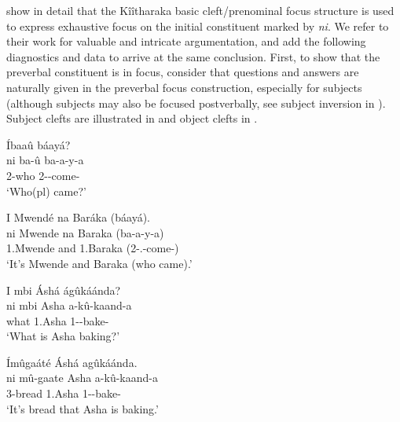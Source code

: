 \documentclass[output=paper]{langscibook}
\begin{document}
\z
\z

\citet{AbelsMuriungi2008} show in detail that the Kîîtharaka basic cleft\slash prenominal focus structure is used to express exhaustive focus on the initial constituent marked by \textit{ni}. We refer to their work for valuable and intricate argumentation, and add the following diagnostics and data to arrive at the same conclusion. First, to show that the preverbal constituent is in focus, consider that questions and answers are naturally given in the preverbal focus construction, especially for subjects (although subjects may also be focused postverbally, see subject inversion in ). Subject clefts are illustrated in  and object clefts in .

\ea
\label{bkm:Ref132102107}
\begin{xlist}
\'{I}baaû báayá?\\
\gll
ni  ba-û  ba-a-y-a\\
\FOC{} 2-who 2\SM-\PST{}-come-\FV{}\\
\glt
‘Who(pl) came?’

I Mwendé na Baráka (báayá).\\
\gll
ni  Mwende  na  Baraka  (ba-a-y-a)\\
\FOC{} 1.Mwende  and  1.Baraka  (2\SM-\N.\PST{}-come-\FV{})\\
\glt ‘It’s Mwende and Baraka (who came).’

\end{xlist}
\z

\ea
\label{bkm:Ref132102116}
\begin{xlist}
I mbi Áshá ágûkáánda?\\
\gll
ni  mbi  Asha  a-kû-kaand-a\\
\FOC{} what 1.Asha 1\SM-\PRS{}-bake-\FV{}\\
\glt
‘What is Asha baking?’

\'{I}mûgaáté Áshá agûkáánda.\\
\gll
ni  mû-gaate  Asha  a-kû-kaand-a\\
\FOC{} 3-bread  1.Asha 1\SM-\PRS{}-bake-\FV{}\\
\glt
‘It’s bread that Asha is baking.’

\end{xlist}
\z
\end{document}
